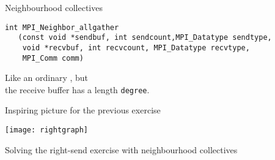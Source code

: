 \begin{frame}[containsverbatim]{Neighbourhood collectives}
\begin{lstlisting}
int MPI_Neighbor_allgather
   (const void *sendbuf, int sendcount,MPI_Datatype sendtype,
    void *recvbuf, int recvcount, MPI_Datatype recvtype,
    MPI_Comm comm)
\end{lstlisting}
Like an ordinary , but\\
the receive buffer has a length \lstinline{degree}.
\end{frame}

\begin{exerciseframe}[rightgraph]
  
\end{exerciseframe}

\begin{frame}{Inspiring picture for the previous exercise}
  \label{fig:rightgraph}

  \texttt{[image: rightgraph]}

  Solving the right-send exercise with neighbourhood
  collectives
\end{frame}

\endinput

\begin{frame}[containsverbatim]{}
\end{frame}

